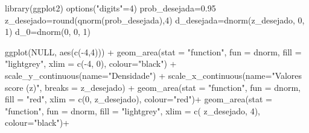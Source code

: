 \documentclass[
]{book}
\newenvironment{Shaded}{\begin{snugshade}}{\end{snugshade}}
\newcommand{\AttributeTok}[1]{\textcolor[rgb]{0.77,0.63,0.00}{#1}}
\newcommand{\ConstantTok}[1]{\textcolor[rgb]{0.00,0.00,0.00}{#1}}
\newcommand{\DecValTok}[1]{\textcolor[rgb]{0.00,0.00,0.81}{#1}}
\newcommand{\FloatTok}[1]{\textcolor[rgb]{0.00,0.00,0.81}{#1}}
\newcommand{\FunctionTok}[1]{\textcolor[rgb]{0.00,0.00,0.00}{#1}}
\newcommand{\NormalTok}[1]{#1}
\newcommand{\OtherTok}[1]{\textcolor[rgb]{0.56,0.35,0.01}{#1}}
\newcommand{\SpecialCharTok}[1]{\textcolor[rgb]{0.00,0.00,0.00}{#1}}
\newcommand{\StringTok}[1]{\textcolor[rgb]{0.31,0.60,0.02}{#1}}
\begin{document}
\hfill\break

\begin{Shaded}
\begin{Highlighting}[]
\FunctionTok{library}\NormalTok{(ggplot2)}
\FunctionTok{options}\NormalTok{(}\StringTok{"digits"}\OtherTok{=}\DecValTok{4}\NormalTok{)}
\NormalTok{prob\_desejada}\OtherTok{=}\FloatTok{0.95}
\NormalTok{z\_desejado}\OtherTok{=}\FunctionTok{round}\NormalTok{(}\FunctionTok{qnorm}\NormalTok{(prob\_desejada),}\DecValTok{4}\NormalTok{)}
\NormalTok{d\_desejada}\OtherTok{=}\FunctionTok{dnorm}\NormalTok{(z\_desejado, }\DecValTok{0}\NormalTok{, }\DecValTok{1}\NormalTok{)}
\NormalTok{d\_0}\OtherTok{=}\FunctionTok{dnorm}\NormalTok{(}\DecValTok{0}\NormalTok{, }\DecValTok{0}\NormalTok{, }\DecValTok{1}\NormalTok{)}

\FunctionTok{ggplot}\NormalTok{(}\ConstantTok{NULL}\NormalTok{, }\FunctionTok{aes}\NormalTok{(}\FunctionTok{c}\NormalTok{(}\SpecialCharTok{{-}}\DecValTok{4}\NormalTok{,}\DecValTok{4}\NormalTok{))) }\SpecialCharTok{+}
  \FunctionTok{geom\_area}\NormalTok{(}\AttributeTok{stat =} \StringTok{"function"}\NormalTok{, }
            \AttributeTok{fun =}\NormalTok{ dnorm, }
            \AttributeTok{fill =} \StringTok{"lightgrey"}\NormalTok{, }
            \AttributeTok{xlim =} \FunctionTok{c}\NormalTok{(}\SpecialCharTok{{-}}\DecValTok{4}\NormalTok{, }\DecValTok{0}\NormalTok{),}
            \AttributeTok{colour=}\StringTok{"black"}\NormalTok{) }\SpecialCharTok{+}
  \FunctionTok{scale\_y\_continuous}\NormalTok{(}\AttributeTok{name=}\StringTok{"Densidade"}\NormalTok{) }\SpecialCharTok{+}
  \FunctionTok{scale\_x\_continuous}\NormalTok{(}\AttributeTok{name=}\StringTok{"Valores score (z)"}\NormalTok{, }\AttributeTok{breaks =}\NormalTok{ z\_desejado) }\SpecialCharTok{+} 
  \FunctionTok{geom\_area}\NormalTok{(}\AttributeTok{stat =} \StringTok{"function"}\NormalTok{,}
            \AttributeTok{fun =}\NormalTok{ dnorm, }
            \AttributeTok{fill =} \StringTok{"red"}\NormalTok{, }
            \AttributeTok{xlim =} \FunctionTok{c}\NormalTok{(}\DecValTok{0}\NormalTok{, z\_desejado),}
            \AttributeTok{colour=}\StringTok{"red"}\NormalTok{)}\SpecialCharTok{+}
  \FunctionTok{geom\_area}\NormalTok{(}\AttributeTok{stat =} \StringTok{"function"}\NormalTok{,}
            \AttributeTok{fun =}\NormalTok{ dnorm, }
            \AttributeTok{fill =} \StringTok{"lightgrey"}\NormalTok{, }
            \AttributeTok{xlim =} \FunctionTok{c}\NormalTok{( z\_desejado, }\DecValTok{4}\NormalTok{),}
            \AttributeTok{colour=}\StringTok{"black"}\NormalTok{)}\SpecialCharTok{+}

\end{Highlighting}
\end{Shaded}
\end{document}
